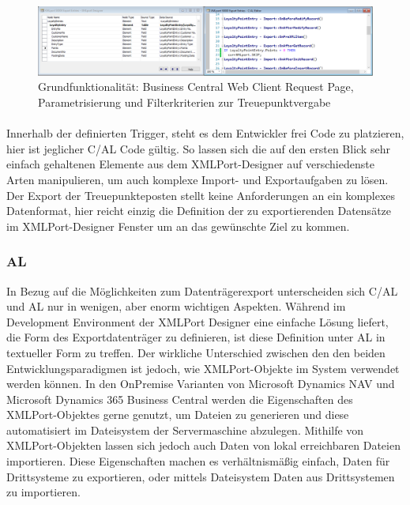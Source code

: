 \begin{figure}[h]
	\centering
	\includegraphics[width=145mm]{images/xmlport}
	\caption{Grundfunktionalität: Business Central Web Client Request Page, Parametrisierung und Filterkriterien zur Treuepunktvergabe}
	\label{fig:Request Page}
\end{figure}

\paragraph{}
Innerhalb der definierten Trigger, steht es dem Entwickler frei Code zu platzieren, hier ist jeglicher C/AL Code gültig. So lassen sich die auf den ersten Blick sehr einfach gehaltenen Elemente aus dem XMLPort-Designer auf verschiedenste Arten manipulieren, um auch komplexe Import- und Exportaufgaben zu lösen. Der Export der Treuepunkteposten stellt keine Anforderungen an ein komplexes Datenformat, hier reicht einzig die Definition der zu exportierenden Datensätze im XMLPort-Designer Fenster um an das gewünschte Ziel zu kommen.
\pagebreak


\subsubsection{AL}
In Bezug auf die Möglichkeiten zum Datenträgerexport unterscheiden sich C/AL und AL nur in wenigen, aber enorm wichtigen Aspekten. Während im Development Environment der XMLPort Designer eine einfache Lösung liefert, die Form des Exportdatenträger zu definieren, ist diese Definition unter AL in textueller Form zu treffen. Der wirkliche Unterschied zwischen den den beiden Entwicklungsparadigmen ist jedoch, wie XMLPort-Objekte im System verwendet werden können. In den OnPremise Varianten von Microsoft Dynamics NAV und Microsoft Dynamics 365 Business Central werden die Eigenschaften des XMLPort-Objektes gerne genutzt, um Dateien zu generieren und diese automatisiert im Dateisystem der Servermaschine abzulegen. Mithilfe von XMLPort-Objekten lassen sich jedoch auch Daten von lokal erreichbaren Dateien importieren. Diese Eigenschaften machen es verhältnismäßig einfach, Daten für Drittsysteme zu exportieren, oder mittels Dateisystem Daten aus Drittsystemen zu importieren. 

